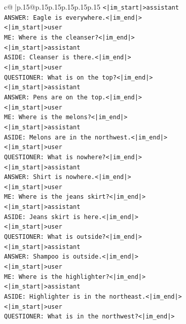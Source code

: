 \documentclass{article}
\begin{document}
{\begin{supertabular}{c@{$\;$}|p{.15\linewidth}@{}p{.15\linewidth}p{.15\linewidth}p{.15\linewidth}p{.15\linewidth}p{.15\linewidth}}
{{{\texttt{<|im\_start|>assistant} \\
\texttt{ANSWER: Eagle is everywhere.<|im\_end|>} \\
\texttt{<|im\_start|>user} \\
\texttt{ME: Where is the cleanser?<|im\_end|>} \\
\texttt{<|im\_start|>assistant} \\
\texttt{ASIDE: Cleanser is there.<|im\_end|>} \\
\texttt{<|im\_start|>user} \\
\texttt{QUESTIONER: What is on the top?<|im\_end|>} \\
\texttt{<|im\_start|>assistant} \\
\texttt{ANSWER: Pens are on the top.<|im\_end|>} \\
\texttt{<|im\_start|>user} \\
\texttt{ME: Where is the melons?<|im\_end|>} \\
\texttt{<|im\_start|>assistant} \\
\texttt{ASIDE: Melons are in the northwest.<|im\_end|>} \\
\texttt{<|im\_start|>user} \\
\texttt{QUESTIONER: What is nowhere?<|im\_end|>} \\
\texttt{<|im\_start|>assistant} \\
\texttt{ANSWER: Shirt is nowhere.<|im\_end|>} \\
\texttt{<|im\_start|>user} \\
\texttt{ME: Where is the jeans skirt?<|im\_end|>} \\
\texttt{<|im\_start|>assistant} \\
\texttt{ASIDE: Jeans skirt is here.<|im\_end|>} \\
\texttt{<|im\_start|>user} \\
\texttt{QUESTIONER: What is outside?<|im\_end|>} \\
\texttt{<|im\_start|>assistant} \\
\texttt{ANSWER: Shampoo is outside.<|im\_end|>} \\
\texttt{<|im\_start|>user} \\
\texttt{ME: Where is the highlighter?<|im\_end|>} \\
\texttt{<|im\_start|>assistant} \\
\texttt{ASIDE: Highlighter is in the northeast.<|im\_end|>} \\
\texttt{<|im\_start|>user} \\
\texttt{QUESTIONER: What is in the northwest?<|im\_end|>} \\
}}}
\end{supertabular}}
\end{document}
